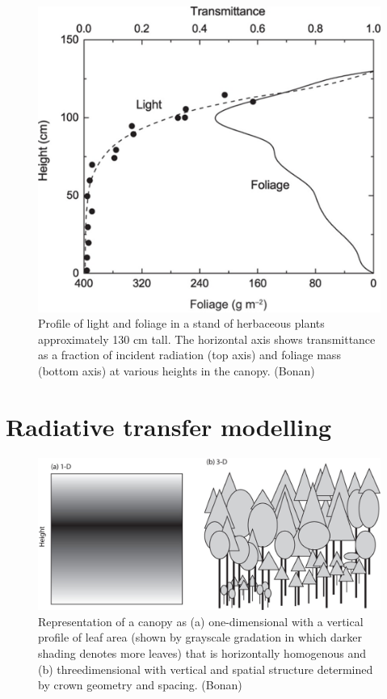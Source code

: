 \documentclass[12pt,oneside]{book}
\begin{document}
\begin{figure}

{\centering \includegraphics[width=0.8\linewidth]{figures/chap3/f36_obs_profile} 

}

\caption{Profile of light and foliage in a stand of herbaceous plants approximately 130 cm tall. The horizontal axis shows transmittance as a fraction of incident radiation (top axis) and foliage mass (bottom axis) at various heights in the canopy. (Bonan)}\label{fig:f36}
\end{figure}

\section{Radiative transfer
modelling}\label{radiative-transfer-modelling}

\begin{figure}

{\centering \includegraphics[width=0.8\linewidth]{figures/chap3/f37_RT_principle} 

}

\caption{Representation of a canopy as (a) one-dimensional with a vertical profile of leaf area (shown by grayscale gradation in which darker shading denotes more leaves) that is horizontally homogenous and (b) threedimensional with vertical and spatial structure determined by crown geometry and spacing. (Bonan)}\label{fig:f37}
\end{figure}
\end{document}
